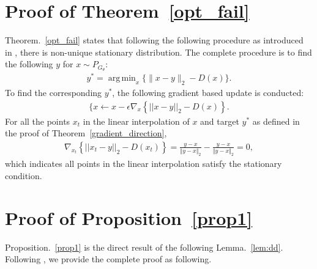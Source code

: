 \documentclass{article}
\DeclareMathOperator*{\argmin}{arg\,min}
\begin{document}
\section{Proof of Theorem~\ref{opt_fail}}\label{proof2}
Theorem.~\ref{opt_fail} states that following the following procedure as introduced in \cite{tanaka2019discriminator}, there is non-unique stationary distribution. The complete procedure is to find the following $y$ for $x \sim P_{G_\theta}$:
\begin{align}
    y^*= \argmin_{x} \{\| x- y\|_2- D(x)\}.
\end{align}
To find the corresponding $y ^*$, the following gradient based update is conducted:
\begin{align}
 \{x \leftarrow x - \epsilon  \nabla_{ x} \left\{ || x - y||_2 -  D(x) \right\}.
\end{align}
For all the points $x_t$ in the linear interpolation of $x$ and target $y^*$ as defined in the proof of Theorem~\ref{gradient_direction},
\begin{align}
    \nabla_{ x_t} \left\{ || x_t - y||_2 -  D( x_t) \right\} = \frac{y-x}{\Vert y -x \Vert_2} - \frac{y-x}{\Vert y -x \Vert_2} = 0,
\end{align}
which indicates all points in the linear interpolation  satisfy the stationary condition.



\section{Proof of Proposition~\ref{prop1}}\label{proof3}

Proposition.~\ref{prop1} is the direct result of the following Lemma.~\ref{lem:dd}. Following \cite{li2017approximate}, we provide the complete proof as following.
\end{document}
